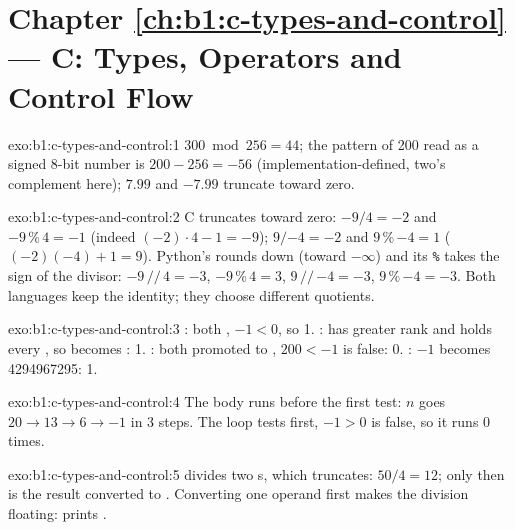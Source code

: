 \section*{Chapter \ref{ch:b1:c-types-and-control} --- C: Types, Operators and Control Flow}

\begin{solution}{exo:b1:c-types-and-control:1}
$300 \bmod 256 = 44$; the pattern of 200 read as a signed 8-bit number is $200 - 256 = -56$ (implementation-defined,
two's complement here); $7.99$ and $-7.99$ truncate toward zero.
\end{solution}

\begin{solution}{exo:b1:c-types-and-control:2}
C truncates toward zero: $-9/4 = -2$ and $-9 \,\%\, 4 = -1$ (indeed $(-2)\cdot 4 - 1 = -9$); $9/{-4} = -2$ and
$9 \,\%\, {-4} = 1$ ($(-2)(-4) + 1 = 9$).
Python's \code{//} rounds down (toward $-\infty$) and its \texttt{\%} takes the sign of the divisor: $-9 \,//\, 4 = -3$,
$-9 \,\%\, 4 = 3$, $9 \,//\, {-4} = -3$, $9 \,\%\, {-4} = -3$. Both languages keep the identity; they choose
different quotients.
\end{solution}

\begin{solution}{exo:b1:c-types-and-control:3}
: both , $-1 < 0$, so 1. :  has greater rank and holds every
, so  becomes : 1. : both promoted to , $200 < -1$ is
false: 0. : $-1$ becomes 4294967295: 1.
\end{solution}

\begin{solution}{exo:b1:c-types-and-control:4}
The  body runs before the first test: $n$ goes $20 \to 13 \to 6 \to -1$ in 3 steps. The  loop
tests first, $-1 > 0$ is false, so it runs 0 times.
\end{solution}

\begin{solution}{exo:b1:c-types-and-control:5}
 divides two s, which truncates: $50 / 4 = 12$; only then is the result converted to
. Converting one operand first makes the division floating:
 prints .
\end{solution}

